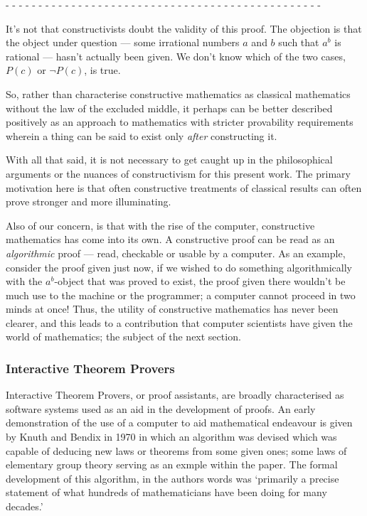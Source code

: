 \documentclass[oneside,12pt]{article}
\begin{document}
\begin{center}
- - - - - - - - - - - - - - - - - - - - - - - - - - - - - - - - - - - - - - - - - - - - - - - -
\end{center}


It's not that constructivists doubt the validity of this proof. The objection is that the object under question --- some irrational numbers $a$ and $b$ such that $a^b$ is rational --- hasn't actually been given. We don't know which of the two cases, $P(c)$ or $\neg P(c)$, is true.

So, rather than characterise constructive mathematics as classical mathematics without the law of the excluded middle, it perhaps can be better described positively as an approach to mathematics with stricter provability requirements wherein a thing can be said to exist only \emph{after} constructing it.

With all that said, it is not necessary to get caught up in the philosophical arguments or the nuances of constructivism for this present work. The primary motivation here is that often constructive treatments of classical results can often prove stronger and more illuminating.


Also of our concern, is that with the rise of the computer, constructive mathematics has come into its own. A constructive proof can be read as an \emph{algorithmic} proof --- read, checkable or usable by a computer. As an example, consider the proof given just now, if we wished to do something algorithmically with the $a^b$-object that was proved to exist, the proof given there wouldn't be much use to the machine or the programmer; a computer cannot proceed in two minds at once! Thus, the utility of constructive mathematics has never been clearer, and this leads to a contribution that computer scientists have given the world of mathematics; the subject of the next section.


\subsubsection{Interactive Theorem Provers}

Interactive Theorem Provers, or proof assistants, are broadly characterised as software systems used as an aid in the development of proofs. An early demonstration of the use of a computer to aid mathematical endeavour is given by Knuth and Bendix in 1970\cite{KNUTH1970263} in which an algorithm was devised which was capable of deducing new laws or theorems from some given ones; some laws of elementary group theory serving as an exmple within the paper. The formal development of this algorithm, in the authors words was `primarily a precise statement of what hundreds of mathematicians have been doing for many decades.'
\end{document}

